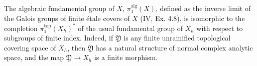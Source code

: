 The algebraic fundamental group of $X$, $\pi_1^{\text{alg}}(X)$, defined as the inverse limit of the Galois groups of finite étale covers of $X$ (IV, Ex. 4.8), is isomorphic to the completion $\pi_1^{\text{top}}(X_h)^*$ of the usual fundamental group of $X_h$ with respect to subgroups of finite index. Indeed, if $\mathfrak{Y}$ is any finite unramified topological covering space of $X_h$, then $\mathfrak{Y}$ has a natural structure of normal complex analytic space, and the map $\mathfrak{Y} \rightarrow X_h$ is a finite morphism.
